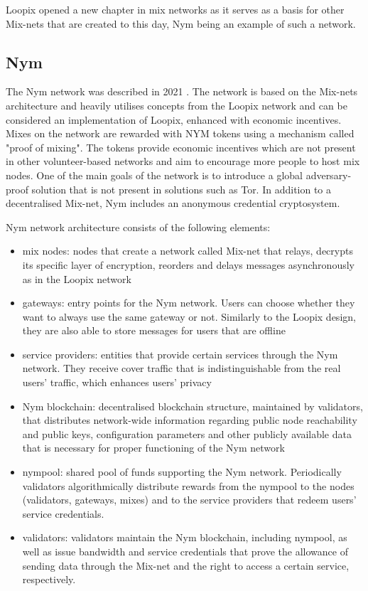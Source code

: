 Loopix opened a new chapter in mix networks as it serves as a basis for other Mix-nets that are created to this day, Nym \cite{nym} being an example of such a network.

\subsection{Nym}
The Nym network was described in 2021 \cite{nym}. The network is based on the Mix-nets architecture and heavily utilises concepts from the Loopix network and can be considered an implementation of Loopix, enhanced with economic incentives. Mixes on the network are rewarded with NYM tokens using a mechanism called "proof of mixing". The tokens provide economic incentives which are not present in other volunteer-based networks and aim to encourage more people to host mix nodes. One of the main goals of the network is to introduce a global adversary-proof solution that is not present in solutions such as Tor. In addition to a decentralised Mix-net, Nym includes an anonymous credential cryptosystem.

Nym network architecture consists of the following elements:
\begin{itemize}
    \item mix nodes: nodes that create a network called Mix-net that relays, decrypts its specific layer of encryption, reorders and delays messages asynchronously as in the Loopix network
    \item gateways: entry points for the Nym network. Users can choose whether they want to always use the same gateway or not. Similarly to the Loopix design, they are also able to store messages for users that are offline
    \item service providers: entities that provide certain services through the Nym network. They receive cover traffic that is indistinguishable from the real users’ traffic, which enhances users’ privacy
    \item Nym blockchain: decentralised blockchain structure, maintained by validators, that distributes network-wide information regarding public node reachability and public keys, configuration parameters and other publicly available data that is necessary for proper functioning of the Nym network
    \item nympool: shared pool of funds supporting the Nym network. Periodically validators algorithmically distribute rewards from the nympool to the nodes (validators, gateways, mixes) and to the service providers that redeem users’ service credentials.
    \item validators: validators maintain the Nym blockchain, including nympool, as well as issue bandwidth and service credentials that prove the allowance of sending data through the Mix-net and the right to access a certain service, respectively.
\end{itemize}

